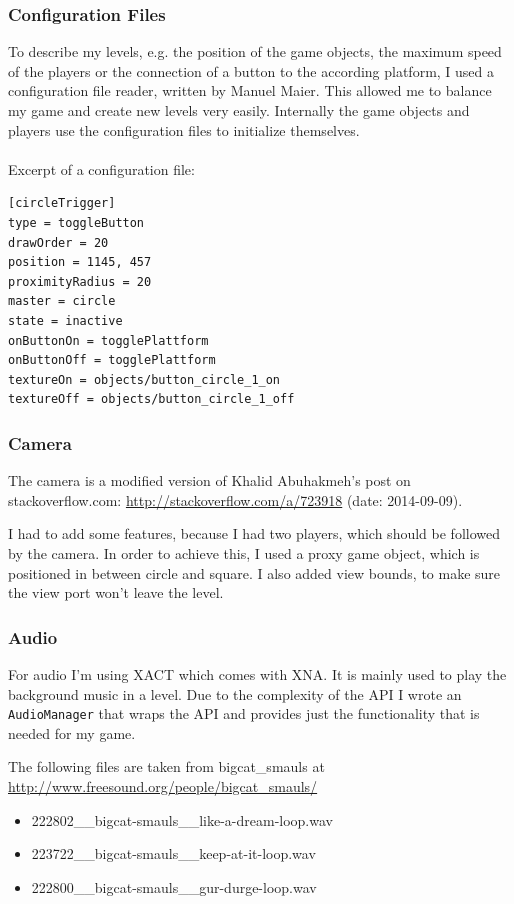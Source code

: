 \documentclass[12pt,a4paper]{scrartcl}
\begin{document}
\subsubsection*{Configuration Files}
To describe my levels, e.g. the position of the game objects, the maximum speed of the players or the connection of a button to the according platform, I used a configuration file reader, written by Manuel Maier. This allowed me to balance my game and create new levels very easily. Internally the game objects and players use the configuration files to initialize themselves. 
\\\\
Excerpt of a configuration file:
\begin{lstlisting}
[circleTrigger]
type = toggleButton
drawOrder = 20
position = 1145, 457
proximityRadius = 20
master = circle
state = inactive
onButtonOn = togglePlattform
onButtonOff = togglePlattform
textureOn = objects/button_circle_1_on
textureOff = objects/button_circle_1_off
\end{lstlisting}

\subsubsection*{Camera}
The camera is a modified version of Khalid Abuhakmeh's post on stackoverflow.com: \url{http://stackoverflow.com/a/723918} (date: 2014-09-09). 

I had to add some features, because I had two players, which should be followed by the camera. In order to achieve this, I used a proxy game object, which is positioned in between circle and square. I also added view bounds, to make sure the view port won't leave the level.  

\subsubsection*{Audio}
For audio I'm using XACT which comes with XNA. It is mainly used to play the background music in a level. Due to the complexity of the API I wrote an \lstinline{AudioManager} that wraps the API and provides just the functionality that is needed for my game.

The following files are taken from bigcat\_smauls at
 \url{http://www.freesound.org/people/bigcat_smauls/}

\begin{itemize}
\item 222802\_\_bigcat-smauls\_\_like-a-dream-loop.wav
\item 223722\_\_bigcat-smauls\_\_keep-at-it-loop.wav
\item 222800\_\_bigcat-smauls\_\_gur-durge-loop.wav
\end{itemize}
\end{document}
